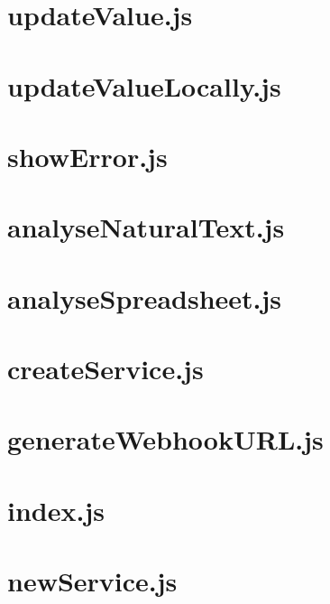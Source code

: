 \documentclass[a4paper,landscape]{report}
\begin{document}
\newpage
\section{updateValue.js}


\newpage
\section{updateValueLocally.js}


\newpage
\section{showError.js}


\newpage
\section{analyseNaturalText.js}


\newpage
\section{analyseSpreadsheet.js}


\newpage
\section{createService.js}


\newpage
\section{generateWebhookURL.js}


\newpage
\section{index.js}


\newpage
\section{newService.js}

\end{document}
